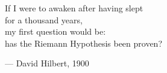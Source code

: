 \begin{flushright}
\begin{hangleftquote}{\QENOpen}{\QENClose}
If I were to awaken after having slept\\
for a thousand years,\\
my first question would be:\\
has the Riemann Hypothesis been proven?
\end{hangleftquote}
\par\smallskip
\normalfont — David Hilbert, 1900
\end{flushright}
